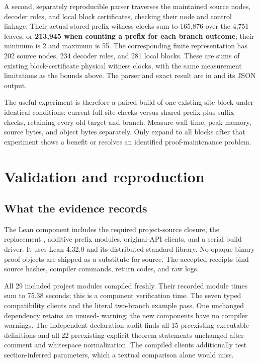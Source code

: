 \documentclass[11pt,letterpaper]{article}
\theoremstyle{definition}\newtheorem{definition}[theorem]{Definition}
\theoremstyle{remark}\newtheorem{remark}[theorem]{Remark}
\newcommand{\code}[1]{\texttt{\detokenize{#1}}}
\begin{document}
A second, separately reproducible parser traverses the maintained source nodes, decoder roles, and local block certificates, checking their node and control linkage. Their actual stored prefix witness clocks sum to 165,876 over the 4,751 leaves, or \textbf{213,945 when counting a prefix for each branch outcome}; their minimum is 2 and maximum is 55. The corresponding finite representation has 202 source nodes, 234 decoder roles, and 281 local blocks. These are sums of existing block-certificate physical witness clocks, with the same measurement limitations as the bounds above. The parser and exact result are in \code{evidence/decoder_prefix_census.py} and its JSON output.

The useful experiment is therefore a paired build of one existing site block under identical conditions: current full-site checks versus shared-prefix plus suffix checks, retaining every old target and branch. Measure wall time, peak memory, source bytes, and object bytes separately. Only expand to all blocks after that experiment shows a benefit or resolves an identified proof-maintenance problem.

\section{Validation and reproduction}

\subsection{What the evidence records}

The Lean component includes the required project-source closure, the replacement \code{KSim}, additive prefix modules, original-API clients, and a serial build driver. It uses Lean 4.32.0 and its distributed standard library. No opaque binary proof objects are shipped as a substitute for source. The accepted receipts bind source hashes, compiler commands, return codes, and raw logs.

All 29 included project modules compiled freshly. Their recorded module times sum to 75.38 seconds; this is a component verification time. The seven typed compatibility clients and the literal two-branch example pass. One unchanged dependency retains an unused-\code{simp} warning; the new components have no compiler warnings. The independent declaration audit finds all 15 preexisting executable definitions and all 22 preexisting explicit theorem statements unchanged after comment and whitespace normalization. The compiled clients additionally test section-inferred parameters, which a textual comparison alone would miss.
\end{document}

